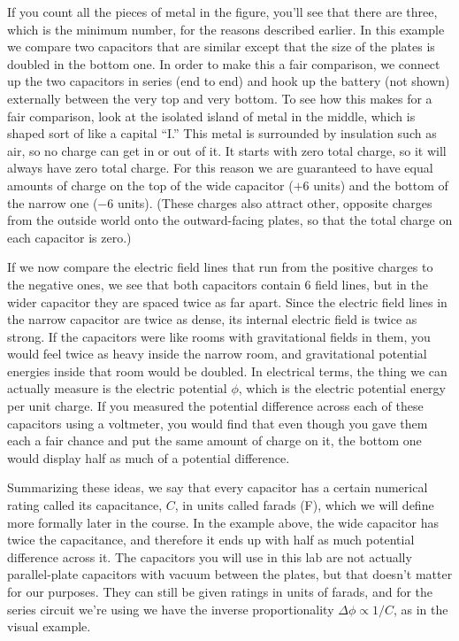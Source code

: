 If you count all the pieces of metal in the figure, you'll see that there are three,
which is the minimum number, for the reasons described earlier.
In this example we compare two capacitors that are similar
except that the size of the plates is doubled in the bottom one. In order to make this
a fair comparison, we connect up the two capacitors in series (end to end) and
hook up the battery (not shown) externally between the very top and
very bottom. To see how this makes for a fair comparison, look at the
isolated island of metal in the middle, which is shaped sort of like
a capital ``I.'' This metal is surrounded by insulation such as air,
so no charge can get in or out of it. It starts with zero total charge,
so it will always have zero total charge. For this reason we are
guaranteed to have equal amounts of charge on the top of
the wide capacitor ($+6$ units) and the bottom of the narrow one ($-6$ units).
(These charges also attract other, opposite charges from the outside world onto
the outward-facing plates, so that the total charge on each capacitor is
zero.)

If we now compare the electric field lines that run from the positive
charges to the negative ones, we see that both capacitors contain 6 field
lines, but in the wider capacitor they are spaced twice as far apart.
Since the electric field lines in the narrow capacitor are twice as dense,
its internal electric field is twice as strong. If the capacitors were
like rooms with gravitational fields in them, you would feel twice as
heavy inside the narrow room, and gravitational potential energies
inside that room would be doubled. In electrical terms, the thing we
can actually measure is the electric potential $\phi$, which is the
electric potential energy per unit charge. If you measured the potential
difference across each of these capacitors using a voltmeter, you would
find that even though you gave them each a fair chance and put the same
amount of charge on it, the bottom one would display half as much of a potential
difference.

Summarizing these ideas, we say that every capacitor has a certain numerical
rating called its capacitance, $C$, in units called farads (F), which we will
define more formally later in the course. In the example above, the wide
capacitor has twice the capacitance, and therefore it ends up with half as much potential difference across it. The capacitors you will 
use in this lab are not actually parallel-plate capacitors with vacuum
between the plates, but that doesn't matter for our purposes. They can
still be given ratings in units of farads, and for the series circuit we're using
we have the inverse proportionality $\Delta\phi\propto 1/C$, as in the visual example.

